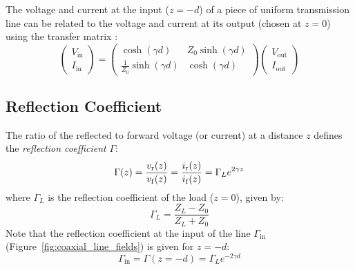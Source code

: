 The voltage and current at the input ($z=-d$) of a piece of uniform transmission line can be related to the voltage and current at its output (chosen at $z=0$) using the transfer matrix :
\begin{equation}
\left( 
\begin{array}{c}
	V_{\mathrm{in}} \\
	I_{\mathrm{in}}
\end{array}
\right)
=
\left( 
\begin{array}{cc}
\cosh  \left(\gamma d\right) & Z_0 \sinh \left(\gamma d \right) \\ 
\frac{1}{Z_0}\sinh \left( \gamma d\right) & \cosh\left(\gamma d\right) 
\end{array} 
\right)
\left( 
\begin{array}{c}
	V_{\mathrm{out}} \\
	I_{\mathrm{out}}
\end{array}
\right)
	\label{eq:voltage_current_transfer_matrix}
\end{equation}




\subsection{Reflection Coefficient}
The ratio of the reflected to forward voltage (or current) at a distance $z$ defines the \textit{reflection coefficient} $\Gamma$:
\begin{equation}
\Gamma(z) = \frac{{v_{\mathrm{r}}}(z)}{{v_{\mathrm{f}}}(z)} =  \frac{{i_{\mathrm{r}}}(z)}{{i_{\mathrm{f}}}(z)} = \Gamma_L e^{2\gamma z}
\label{eq:Gamma_at_z}
\end{equation}
where $\Gamma_L$ is the reflection coefficient of the load ($z=0$), given by:
\begin{equation}
	\Gamma_L = \frac{Z_L - Z_0}{Z_L + Z_0}
	\label{eq:Gamma_L}
\end{equation}
Note that the reflection coefficient at the input of the line $\Gamma_{\mathrm{in}}$ (Figure~\ref{fig:coaxial_line_fields}) is given for $z=-d$:
$$
\Gamma_{\mathrm{in}}=\Gamma(z=-d)=\Gamma_L e^{-2\gamma d}
$$

